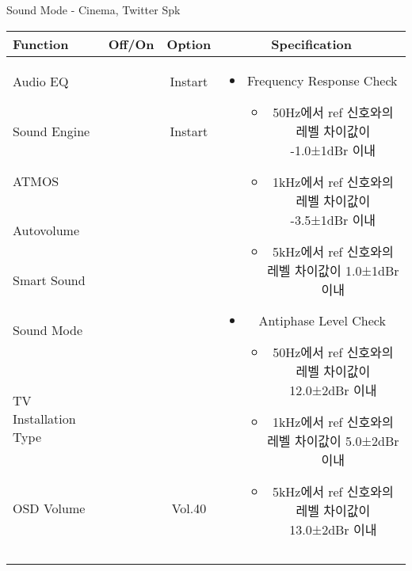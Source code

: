 \begin{frame}[t]{Sound Mode - Cinema, Twitter Spk}
\begin{tiny}
\begin{tabular}{@{}lccc@{}}
\toprule
Function & Off/On & Option & Specification \\
\midrule
Audio EQ & \color{black}{Off} & Instart &
\multirow{10}{60mm}{
\begin{itemize}
\item Frequency Response Check
	\begin{itemize}
	\item 50Hz에서 ref 신호와의 레벨 차이값이 -1.0±1dBr 이내	
	\item 1kHz에서 ref 신호와의 레벨 차이값이 -3.5±1dBr 이내
	\item 5kHz에서 ref 신호와의 레벨 차이값이 1.0±1dBr 이내
	\end{itemize}
\item Antiphase Level Check
	\begin{itemize}
	\item 50Hz에서 ref 신호와의 레벨 차이값이 12.0±2dBr 이내
	\item 1kHz에서 ref 신호와의 레벨 차이값이 5.0±2dBr 이내
	\item 5kHz에서 ref 신호와의 레벨 차이값이 13.0±2dBr 이내
	\end{itemize}
\end{itemize}
} \\
Sound Engine & \color{blue}{On} & Instart & \\
ATMOS & \color{black}{Off}  & & \\
Autovolume & \color{black}{Off} & & \\
Smart Sound & \color{black}{Off} & & \\
Sound Mode & \color{blue}{On} & \color{blue}{Cinema} & \\
TV Installation Type & \color{blue}{On} & \color{black}{Standtype1} & \\
OSD Volume & \color{blue}{On} & Vol.40 & \\
& & & \\
& & & \\
& & & \\
& & & \\\midrule
\end{tabular}
\end{tiny}


\end{frame}
